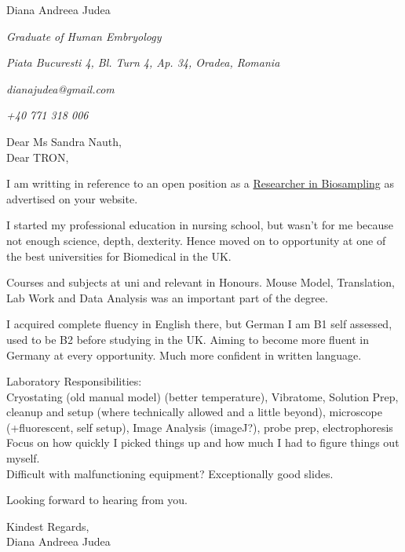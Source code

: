 \documentclass[paper=a4,fontsize=11pt]{scrartcl} %
\newcommand{\sepspace}{\vspace*{1em}}		%
\newcommand{\MyName}[1]{ %
  \Huge \usefont{OT1}{phv}{b}{n} \hfill #1
  \par \normalsize \normalfont}
\newcommand{\MySlogan}[4]{ %
  \large \usefont{OT1}{phv}{m}{n}\hfill \textit{#1} 
  \sepspace
  \par \normalsize \usefont{OT1}{phv}{m}{n}\hfill \textit{#2}
  \par \normalsize \usefont{OT1}{phv}{m}{n}\hfill \textit{#3}
  \par \normalsize \usefont{OT1}{phv}{m}{n}\hfill \textit{#4}
  \par \normalsize \normalfont}
\begin{document}
  
  \MyName{Diana Andreea Judea}
  \MySlogan{Graduate of Human Embryology}{Piata Bucuresti 4, Bl. Turn 4, Ap. 34, Oradea, Romania}{dianajudea@gmail.com}{+40 771 318 006}
  \sepspace \sepspace
  
  \noindent
  Dear Ms Sandra Nauth, \\
  Dear TRON,
  
  \sepspace
  
  \noindent
  I am writting in reference to an open position as a \href{https://tron-mainz.de/wp-content/uploads/2021/03/Research_Scientist_Biosampling.pdf}{Researcher in Biosampling} as advertised on your website.
  \sepspace
  
  \noindent
  I started my professional education in nursing school, but wasn't for me because not enough science, depth, dexterity.  Hence moved on to opportunity at one of the best universities for Biomedical in the UK.
  \sepspace

  \noindent
  Courses and subjects at uni and relevant in Honours.  Mouse Model, Translation, Lab Work and Data Analysis was an important part of the degree. \\
  \sepspace
  
  \noindent
  I acquired complete fluency in English there, but German I am B1 self assessed, used to be B2 before studying in the UK.  Aiming to become more fluent in Germany at every opportunity.  Much more confident in written language.
  \sepspace

  \noindent
  Laboratory Responsibilities: \\
  Cryostating (old manual model) (better temperature), Vibratome, Solution Prep, cleanup and setup (where technically allowed and a little beyond), microscope (+fluorescent, self setup), Image Analysis (imageJ?), probe prep, electrophoresis \\
  Focus on how quickly I picked things up and how much I had to figure things out myself. \\
  Difficult with malfunctioning equipment?  Exceptionally good slides.
  \sepspace
  
  \sepspace
  
  \noindent
  Looking forward to hearing from you.
  \sepspace
  
  \noindent
  Kindest Regards, \\
  Diana Andreea Judea
\end{document}
